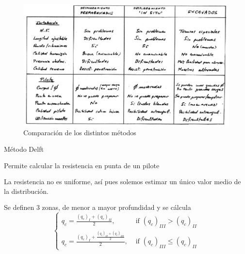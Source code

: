 \begin{figure}[H]
		\centering
		\includegraphics[width=\textwidth]{img/compar}
		\caption{Comparación de los distintos métodos}
		\label{fig:compar}
\end{figure}

\begin{mybox}{Método Delft}
	\begin{ldef}[Delft]
		Permite calcular la resistencia en punta de un pilote
	\end{ldef}

	La resistencia no es uniforme, así pues solemos estimar un único valor medio de la distribución.


	Se definen 3 zonas, de menor a mayor profundidad y se cálcula
	\begin{equation}
		\begin{cases}
			q_c = \frac{(q_c)_{I}+(q_c)_{II}}{2}, &\text{ if }(q_c)_{III} >(q_c)_{II} \\
			q_c = \frac{(q_c)_{I}+\frac{(q_c)_{II}+(q_c)_{III}}{2}}{2}, &\text{ if }(q_c)_{III} \leq(q_c)_{II}
		\end{cases}
	\end{equation}
\end{mybox}

